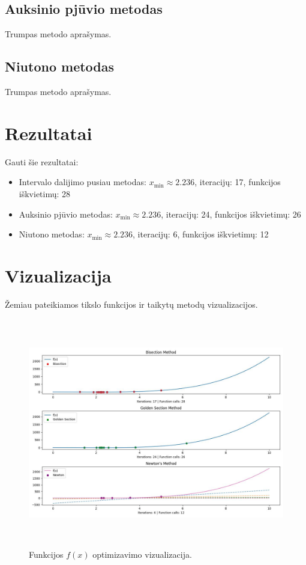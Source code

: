 \documentclass[lithuanian,a4paper,12pt]{article}
\begin{document}
\subsection{Auksinio pjūvio metodas}
Trumpas metodo aprašymas.

\subsection{Niutono metodas}
Trumpas metodo aprašymas.

\section{Rezultatai}
Gauti šie rezultatai:
\begin{itemize}
    \item Intervalo dalijimo pusiau metodas: 
        $x_{\min} \approx 2.236$, iteracijų: 17, funkcijos iškvietimų: 28
    \item Auksinio pjūvio metodas:
        $x_{\min} \approx 2.236$, iteracijų: 24, funkcijos iškvietimų: 26
    \item Niutono metodas:
        $x_{\min} \approx 2.236$, iteracijų: 6, funkcijos iškvietimų: 12
\end{itemize}

\section{Vizualizacija}
Žemiau pateikiamos tikslo funkcijos ir taikytų metodų vizualizacijos.
\begin{figure}[H]
    \centering
    \includegraphics[width=\textwidth,height=10cm]{figure-1.jpeg}
    \caption{\label{fig:all}Funkcijos $f(x)$ optimizavimo vizualizacija.}
\end{figure}
\end{document}
